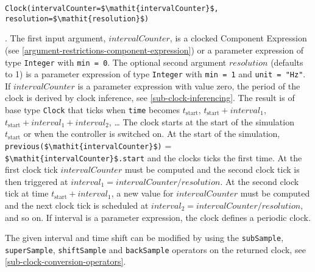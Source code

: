 \begin{operatordefinition*}[Clock]\label{modelica:clock-rational}
\begin{synopsis}\begin{lstlisting}
Clock(intervalCounter=$\mathit{intervalCounter}$, resolution=$\mathit{resolution}$)
\end{lstlisting}\end{synopsis}
\begin{semantics}
.
The first input argument, $\mathit{intervalCounter}$, is a clocked Component Expression (see \cref{argument-restrictions-component-expression}) or a parameter expression of type \lstinline!Integer! with \lstinline!min = 0!.
The optional second argument $\mathit{resolution}$ (defaults to 1) is a parameter expression of type \lstinline!Integer! with \lstinline!min = 1! and \lstinline!unit = "Hz"!.
If $\mathit{intervalCounter}$ is a parameter expression with value zero, the period of the clock is derived by clock inference, see \cref{sub-clock-inferencing}.
The result is of base type \lstinline!Clock! that ticks when \lstinline!time! becomes $t_{\mathrm{start}}$, $t_{\mathrm{start}} + \mathit{interval}_{1}$, $t_{\mathrm{start}} + \mathit{interval}_{1} + \mathit{interval}_{2}$, \@\ldots{}
The clock starts at the start of the simulation $t_{\mathrm{start}}$ or when the controller is switched on.
At the start of the simulation, \lstinline!previous($\mathit{intervalCounter}$)! = \lstinline!$\mathit{intervalCounter}$.start! and the clocks ticks the first time.
At the first clock tick $\mathit{intervalCounter}$ must be computed and the second clock tick is then triggered at $\mathit{interval}_{1} = \mathit{intervalCounter}/\mathit{resolution}$.
At the second clock tick at time $t_{\mathrm{start}} + \mathit{interval}_{1}$, a new value for $\mathit{intervalCounter}$ must be computed and the next clock tick is scheduled at $\mathit{interval}_{2} = \mathit{intervalCounter}/\mathit{resolution}$, and so on.
If
interval %
is a parameter expression, the clock defines a periodic clock.

\begin{nonnormative}
The given interval and time shift %
can be modified by using the \lstinline!subSample!, \lstinline!superSample!, \lstinline!shiftSample! and \lstinline!backSample! operators on the returned clock, see \cref{sub-clock-conversion-operators}.
\end{nonnormative}


\end{semantics}
\end{operatordefinition*}
